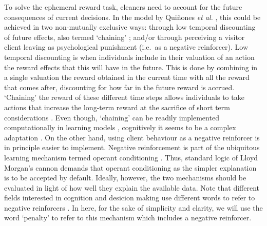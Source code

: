 \documentclass[]{rsos}%
\begin{document}
To solve the ephemeral reward task, cleaners need to account for
the future consequences of current decisions. In the model by
Quiñones \emph{et al.} \citep{quinones_Reinforcement_2019}, this could be achieved in
two non-mutually exclusive ways: through low temporal discounting of
future effects, also termed `chaining' \citep{enquist_Power_2016}; and/or
through perceiving a visitor client leaving as psychological punishment
(i.e.~as a negative reinforcer). Low temporal discounting is when
individuals include in their valuation of an action the reward effects
that this will have in the future. This is done by combining in a single
valuation the reward obtained in the current time with all the reward that
comes after, discounting for how far in the future reward
is accrued. `Chaining' the reward of these different time steps allows
individuals to take actions that increase the long-term reward at the sacrifice
of short term considerations \citep{enquist_Power_2016}. Even though, `chaining'
can be readily implemented computationally in learning models
\citep{enquist_Power_2016, sutton_Reinforcement_2018}, cognitively it seems to be
a complex adaptation \citep{suddendorf_Evolution_2007}. On the other hand,
using client behaviour as a negative reinforcer is in principle
easier to implement. Negative reinforcement is part of the ubiquitous
learning mechanism termed operant conditioning \citep{thorndike_Animal_1898, skinner_Behavior_1938}. Thus, standard logic of
Lloyd Morgan's cannon demands that operant conditioning as the simpler
explanation is to be accepted by default. Ideally, however, the two
mechanisms should be evaluated in light of how well
they explain the available data. Note that different fields interested in
cognition and desicion making use different words to refer to negative
reinforcers \citep{quinones_Reinforcement_2019, sutton_Reinforcement_2018}.
In here, for the sake of simplicity and clarity, we will use the word
`penalty' to refer to this mechanism which includes a negative reinforcer.
\end{document}
